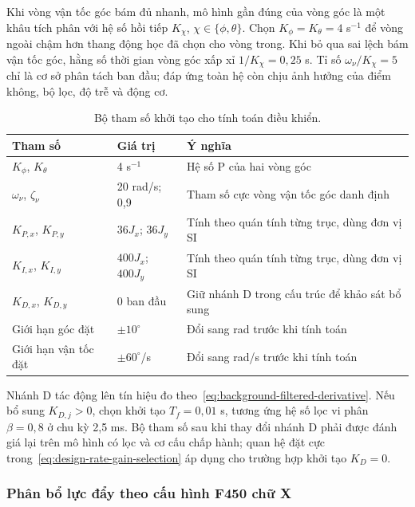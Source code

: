 Khi vòng vận tốc góc bám đủ nhanh, mô hình gần đúng của vòng góc là một khâu tích phân với hệ số hồi tiếp $K_\chi$, $\chi\in\{\phi,\theta\}$. Chọn $K_\phi=K_\theta=4$ s$^{-1}$ để vòng ngoài chậm hơn thang động học đã chọn cho vòng trong. Khi bỏ qua sai lệch bám vận tốc góc, hằng số thời gian vòng góc xấp xỉ $1/K_\chi=0{,}25$ s. Tỉ số $\omega_\nu/K_\chi=5$ chỉ là cơ sở phân tách ban đầu; đáp ứng toàn hệ còn chịu ảnh hưởng của điểm không, bộ lọc, độ trễ và động cơ.

\begin{table}[htbp]
	\centering
	\caption{Bộ tham số khởi tạo cho tính toán điều khiển.}
	\label{tab:design-controller-initial-parameters}
	\begin{tabularx}{\linewidth}{|C{3.6cm}|C{3.0cm}|Y|}
		\hline
		\textbf{Tham số}          & \textbf{Giá trị}   & \textbf{Ý nghĩa}                               \\
		\hline
		$K_\phi$, $K_\theta$      & 4 s$^{-1}$         & Hệ số P của hai vòng góc                       \\
		\hline
		$\omega_\nu$, $\zeta_\nu$ & 20 rad/s; 0,9      & Tham số cực vòng vận tốc góc danh định         \\
		\hline
		$K_{P,x}$, $K_{P,y}$      & $36J_x$; $36J_y$   & Tính theo quán tính từng trục, dùng đơn vị SI  \\
		\hline
		$K_{I,x}$, $K_{I,y}$      & $400J_x$; $400J_y$ & Tính theo quán tính từng trục, dùng đơn vị SI  \\
		\hline
		$K_{D,x}$, $K_{D,y}$      & 0 ban đầu          & Giữ nhánh D trong cấu trúc để khảo sát bổ sung \\
		\hline
		Giới hạn góc đặt          & $\pm10^\circ$      & Đổi sang rad trước khi tính toán               \\
		\hline
		Giới hạn vận tốc đặt      & $\pm60^\circ$/s    & Đổi sang rad/s trước khi tính toán             \\
		\hline
	\end{tabularx}
\end{table}

Nhánh D tác động lên tín hiệu đo theo~\eqref{eq:background-filtered-derivative}. Nếu bổ sung $K_{D,j}>0$, chọn khởi tạo $T_f=0{,}01$ s, tương ứng hệ số lọc vi phân $\beta=0{,}8$ ở chu kỳ 2,5 ms. Bộ tham số sau khi thay đổi nhánh D phải được đánh giá lại trên mô hình có lọc và cơ cấu chấp hành; quan hệ đặt cực trong~\eqref{eq:design-rate-gain-selection} áp dụng cho trường hợp khởi tạo $K_D=0$.

\subsubsection{Phân bổ lực đẩy theo cấu hình F450 chữ X}


